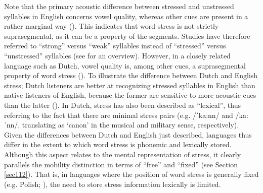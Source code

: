 Note that the primary acoustic difference between stressed and unstressed syllables in English concerns vowel quality, whereas other cues are present in a rather marginal way (\citealt{fear_strong_1995}). This indicates that word stress is not strictly suprasegmental, as it can be a property of the segments. Studies have therefore referred to ``strong'' versus ``weak'' syllables instead of ``stressed'' versus ``unstressed'' syllables (see \citealt{cutler_prosody_1997} for an overview). However, in a closely related language such as Dutch, vowel quality is, among other cues, a suprasegmental property of word stress (\citealt{sluijter_spectral_1996}). To illustrate the difference between Dutch and English stress; Dutch listeners are better at recognizing stressed syllables in English than native listeners of English, because the former are sensitive to more acoustic cues than the latter (\citealt{cutler_dutch_2007}). In Dutch, stress has also been described as ``lexical'', thus referring to the fact that there are minimal stress pairs (e.g. /ˈka:nn/ and /ka:ˈnn/, translating as `canon' in the musical and military sense, respectively). Given the differences between Dutch and English just described, languages thus differ in the extent to which word stress is phonemic and lexically stored. Although this aspect relates to the mental representation of stress, it clearly parallels the mobility distinction in terms of ``free'' and ``fixed'' (see Section \ref{sec112}). That is, in languages where the position of word stress is generally fixed (e.g. Polish; \citealt{jassem_akcent_1962}), the need to store stress information lexically is limited. \par
